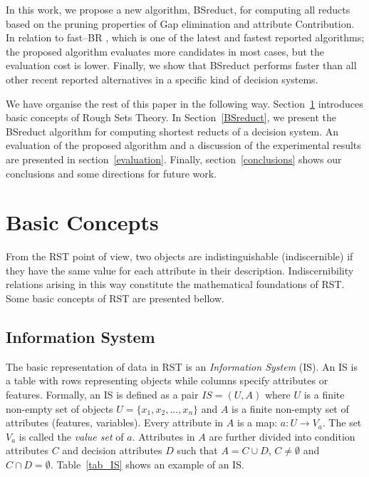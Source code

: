 \documentclass[number,preprint,review,12pt]{elsarticle}
\begin{document}
  In this work, we propose a new algorithm, BSreduct, for computing all reducts based on the pruning properties of Gap elimination and attribute Contribution. 
  In relation to fast--BR \citep{Lias13}, which is one of the latest and fastest reported algorithms; the proposed algorithm evaluates more candidates in most cases, but the evaluation cost is lower. Finally, we show that BSreduct performs faster than all other recent reported alternatives in a specific kind of decision systems. 
  
  We have organise the rest of this paper in the following way. Section~\ref{basicConcepts} introduces basic concepts of Rough Sets Theory.  In Section~\ref{BSreduct}, we present the BSreduct algorithm for computing shortest reducts of a decision system. An evaluation of the proposed algorithm and a discussion of the experimental results are presented in section~\ref{evaluation}. Finally, section~\ref{conclusions} shows our conclusions and some directions for future work.
   
\section{Basic Concepts}\label{basicConcepts}
  From the RST point of view, two objects are indistinguishable (indiscernible) if they have the same value for each attribute in their description. Indiscernibility relations arising in this way constitute the mathematical foundations of RST. Some basic concepts of RST are presented bellow.
  
\subsection{Information System}
  The basic representation of data in RST is an \emph{Information System} (IS). An IS is a table with rows
  representing objects while columns specify attributes or features. Formally, an IS is defined as a pair
  $IS=(U,A)$ where $U$ is a finite non-empty set of objects $U=\lbrace x_1,x_2,...,x_n\rbrace$ and $A$ is a 
  finite non-empty set
  of attributes (features, variables). Every attribute in $A$ is a map: $a: U \rightarrow V_a$. The set $V_a$ is
  called the \textit{value set} of $a$. Attributes in $A$ are further divided into condition attributes $C$ and 
  decision attributes $D$ such that $A=C \cup D$, $C \neq \emptyset$ and $C \cap D =\emptyset$. 
  Table~\ref{tab_IS} shows an example of an IS.
  
\end{document}
